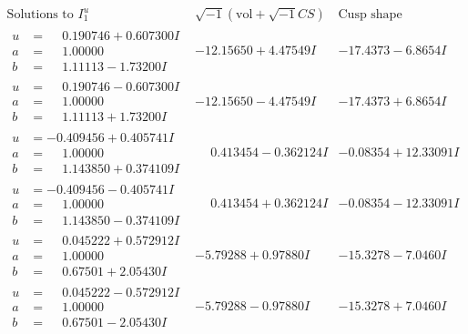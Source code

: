 \documentclass[1p]{elsarticle_modified}
\theoremstyle{definition}
\newcommand{\I}{\sqrt{-1}}
\begin{document}
$$\begin{array}{c|c|c}
\text{Solutions to }I^u_{1}& \I (\text{vol} + \sqrt{-1}CS) & \text{Cusp shape}\\
 \hline 
\begin{aligned}
u &= \phantom{-}0.190746 + 0.607300 I \\
a &= \phantom{-}1.00000\phantom{ +0.000000I} \\
b &= \phantom{-}1.11113 - 1.73200 I\end{aligned}
 & -12.15650 + 4.47549 I & -17.4373 - 6.8654 I \\ \hline\begin{aligned}
u &= \phantom{-}0.190746 - 0.607300 I \\
a &= \phantom{-}1.00000\phantom{ +0.000000I} \\
b &= \phantom{-}1.11113 + 1.73200 I\end{aligned}
 & -12.15650 - 4.47549 I & -17.4373 + 6.8654 I \\ \hline\begin{aligned}
u &= -0.409456 + 0.405741 I \\
a &= \phantom{-}1.00000\phantom{ +0.000000I} \\
b &= \phantom{-}1.143850 + 0.374109 I\end{aligned}
 & \phantom{-}0.413454 - 0.362124 I & -0.08354 + 12.33091 I \\ \hline\begin{aligned}
u &= -0.409456 - 0.405741 I \\
a &= \phantom{-}1.00000\phantom{ +0.000000I} \\
b &= \phantom{-}1.143850 - 0.374109 I\end{aligned}
 & \phantom{-}0.413454 + 0.362124 I & -0.08354 - 12.33091 I \\ \hline\begin{aligned}
u &= \phantom{-}0.045222 + 0.572912 I \\
a &= \phantom{-}1.00000\phantom{ +0.000000I} \\
b &= \phantom{-}0.67501 + 2.05430 I\end{aligned}
 & -5.79288 + 0.97880 I & -15.3278 - 7.0460 I \\ \hline\begin{aligned}
u &= \phantom{-}0.045222 - 0.572912 I \\
a &= \phantom{-}1.00000\phantom{ +0.000000I} \\
b &= \phantom{-}0.67501 - 2.05430 I\end{aligned}
 & -5.79288 - 0.97880 I & -15.3278 + 7.0460 I \\ \hline\begin{aligned}

\end{aligned}
\end{array}$$
\end{document}
